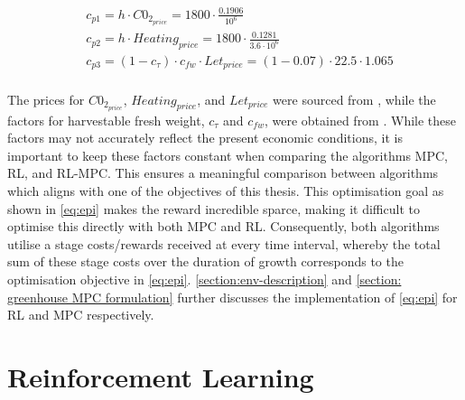 \begin{equation}\label{eq:pricing factors}
	\begin{aligned}
		& c_{p1} = h \cdot C0_{2_{price}}  = 1800 \cdot \frac{0.1906}{10^{6}}\\
		& c_{p2} = h \cdot  Heating_{price} = 1800 \cdot \frac{0.1281}{3.6\cdot 10^{6}}\\
		& c_{p3} = (1-c_{\tau})  \cdot c_{fw} \cdot Let_{price}= (1-0.07) \cdot 22.5 \cdot 1.065 \\
	\end{aligned}
\end{equation}

The prices for $C0_{2_{price}}$, $Heating_{price}$, and $Let_{price}$ were sourced from \cite{vandenbemdRobustDeepReinforcement}, while the factors for harvestable fresh weight, $c_{\tau}$ and $c_{fw}$, were obtained from \cite{hentenGreenhouseClimateManagement1994}. While these factors may not accurately reflect the present economic conditions, it is important to keep these factors constant when comparing the algorithms MPC, RL, and RL-MPC. This ensures a meaningful comparison between algorithms which aligns with one of the objectives of this thesis. This optimisation goal as shown in \autoref{eq:epi} makes the reward incredible sparce, making it difficult to optimise this directly with both MPC and RL. Consequently, both algorithms utilise a stage costs/rewards received at every time interval, whereby the total sum of these stage costs over the duration of growth corresponds to the optimisation objective in \autoref{eq:epi}. \autoref{section:env-description} and \autoref{section: greenhouse MPC formulation} further discusses the implementation of \autoref{eq:epi} for RL and MPC respectively.


\section{Reinforcement Learning}\label{section:RL}

